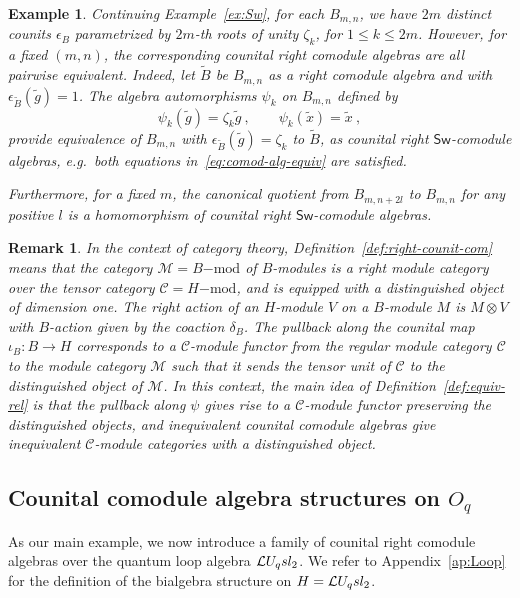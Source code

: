 \documentclass[11pt]{amsart}
\numberwithin{equation}{section}
\newtheorem{example}[thm]{Example}
\newtheorem{rem}[thm]{Remark}
\numberwithin{equation}{section}
\begin{document}
\begin{example}
Continuing Example~\ref{ex:Sw},
for each $B_{m,n}$, we have $2m$ distinct counits $\epsilon_B$ parametrized by $2m$-th roots of unity $\zeta_k$, for $1\leq k \leq 2m$. However, for a fixed $(m,n)$, the corresponding counital right comodule algebras are all pairwise equivalent. Indeed, let $\tilde{B}$ be $B_{m,n}$ as a right comodule algebra and with $\epsilon_{\tilde{B}}(\tilde{g})=1$. The algebra automorphisms $\psi_k$ on $B_{m,n}$ defined by
$$
\psi_k(\tilde{g}) = \zeta_k\tilde{g}\ , \qquad
\psi_k(\tilde{x}) = \tilde{x}\ ,
$$
provide equivalence of $B_{m,n}$ with $\epsilon_{\tilde{B}}(\tilde{g})=\zeta_k$ to $\tilde{B}$, as counital right $\mathsf{Sw}$-comodule algebras, e.g.\ both equations in~\eqref{eq:comod-alg-equiv} are satisfied.

Furthermore, for a fixed $m$, the canonical quotient from $B_{m,n+2l}$ to $B_{m,n}$ for any positive $l$ is a homomorphism of counital right $\mathsf{Sw}$-comodule algebras.
\end{example}

\begin{rem}
In the context of category theory, Definition~\ref{def:right-counit-com} means that the category $\mathcal{M}=B\mathrm{-mod}$ of $B$-modules is a right module category over the tensor category $\mathcal{C}=H\mathrm{-mod}$, and is equipped with a distinguished  object of dimension one. The right action of an $H$-module $V$ on a $B$-module $M$ is $M\otimes V$ with $B$-action given by the coaction $\delta_B$. The pullback along the counital map $\iota_B\colon B \to H$ corresponds to a $\mathcal{C}$-module functor from the regular module category $\mathcal{C}$ to the 
module category $\mathcal{M}$ such that it sends the tensor unit of $\mathcal{C}$ to the distinguished object of $\mathcal{M}$.
In this context, the main idea of  Definition~\ref{def:equiv-rel} is that the pullback along $\psi$ gives rise to a $\mathcal{C}$-module functor preserving the distinguished objects, and inequivalent counital comodule algebras give inequivalent $\mathcal{C}$-module categories with a distinguished object.
\end{rem}
	
\subsection{Counital comodule algebra structures on $O_q$}
\label{sec:comod-Oq}
As our main example, we now introduce a family of counital right comodule algebras over the quantum loop algebra $\mathcal{L} U_q sl_2$. We  refer to Appendix~\ref{ap:Loop} for the definition of the bialgebra structure on $H=\mathcal{L} U_q sl_2$.
\end{document}
